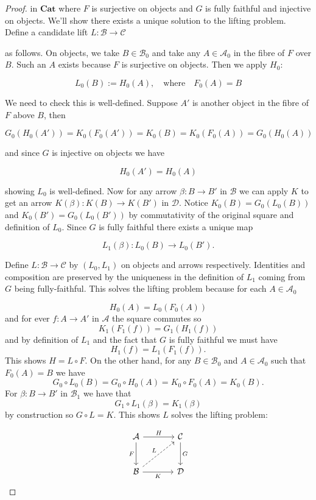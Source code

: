 \documentclass[11pt]{amsart}
\theoremstyle{plain}
\theoremstyle{definition}
\newcommand{\cA}{{\mathcal A}}
\newcommand{\cB}{{\mathcal B}}
\newcommand{\cC}{{\mathcal C}}
\newcommand{\cD}{{\mathcal D}}
\newcommand{\Cat}{\mathbf{Cat}}
\newcommand{\noi}{{\noindent}}
\begin{document}
\begin{proof}
\noi in $\Cat$ where $F$ is surjective on objects and $G$ is fully faithful and injective on objects. We'll show there exists a unique solution to the lifting problem. Define a candidate lift $ L : \cB \to \cC$ 

\noi as follows. On objects, we take $B \in \cB_0$ and take any $A \in \cA_0$ in the fibre of $F$ over $B$. Such an $A$ exists because $F$ is surjective on objects. Then we apply $H_0$: 

\[ L_0(B) := H_0 ( A ) , \quad \text{where} \quad  F_0(A) = B \]

\noi We need to check this is well-defined. Suppose $A'$ is another object in the fibre of $F$ above $B$, then 

\[ G_0(H_0(A')) = K_0(F_0(A')) = K_0(B) = K_0(F_0(A)) = G_0 ( H_0 ( A))\]

\noi and since $G$ is injective on objects we have 

\[ H_0(A') = H_0(A)\]

\noi showing $L_0$ is well-defined. Now for any arrow $\beta : B \to B'$ in $\cB$ we can apply $K$ to get an arrow $K(\beta) : K(B) \to K(B')$ in $\cD$. Notice $K_0(B) = G_0(L_0(B))$ and $K_0(B') = G_0(L_0(B'))$ by commutativity of the original square and definition of $L_0$. Since $G$ is fully faithful there exists a unique map

\[ L_1(\beta) : L_0(B) \to L_0(B') .\]

\noi Define $L : \cB \to \cC$ by $(L_0, L_1)$ on objects and arrows respectively. Identities and composition are preserved by the uniqueness in the definition of $L_1$ coming from $G$ being fully-faithful. This solves the lifting problem because for each $A \in \cA_0$ 


\[ H_0(A) = L_0 ( F_0 ( A))\]
\noi and for ever $f : A \to A'$ in $\cA$ the square commutes so
\[K_1 (F_1 (f)) = G_1 (H_1 (f)) \]
\noi and by definition of $L_1$ and the fact that $G$ is fully faithful we must have
\[ H_1(f) = L_1(F_1(f)).\]
\noi This shows $H = L \circ F$. On the other hand, for any $B \in \cB_0$ and $A \in \cA_0$ such that $F_0 (A) = B$ we have 
\[G_0 \circ L_0 (B) = G_0 \circ H_0 (A) = K_0 \circ F_0 (A) = K_0 (B). \]
\noi For $\beta : B \to B'$ in $\cB_1$ we have that 
\[G_1 \circ L_1 (\beta) = K_1 (\beta)\]
\noi by construction so $G \circ L = K$. This shows $L$ solves the lifting problem: 



\[ \begin{tikzcd}[column sep = large, row sep = large]
    \cA \rar["H"] \dar["F"'] &\cC \dar["G"] \\
    \cB \rar["K"'] \ar[ur, dashed, "L"] & \cD 
\end{tikzcd}\]


\end{proof}
\end{document}
